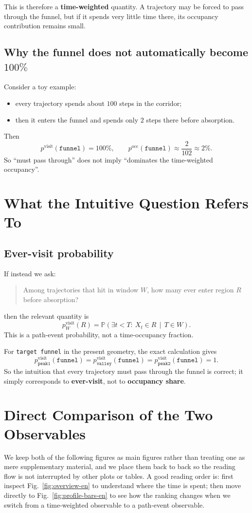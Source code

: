 \documentclass[11pt]{article}
\begin{document}
This is therefore a \textbf{time-weighted} quantity. A trajectory may be forced to pass through the funnel, but if it spends very little time there, its occupancy contribution remains small.

\subsection{Why the funnel does not automatically become $100\%$}
Consider a toy example:
\begin{itemize}
  \item every trajectory spends about $100$ steps in the corridor;
  \item then it enters the funnel and spends only $2$ steps there before absorption.
\end{itemize}
Then
\[
p^{\mathrm{visit}}(\texttt{funnel}) = 100\%,
\qquad
p^{\mathrm{occ}}(\texttt{funnel}) \approx \frac{2}{102}\approx 2\%.
\]
So ``must pass through'' does not imply ``dominates the time-weighted occupancy''.

\section{What the Intuitive Question Refers To}
\subsection{Ever-visit probability}
If instead we ask:
\begin{quote}
Among trajectories that hit in window $W$, how many ever enter region $R$ before absorption?
\end{quote}
then the relevant quantity is
\[
p^{\mathrm{visit}}_W(R)
=
\mathbb{P}\!\left(\exists t<T:\ X_t\in R \,\middle|\, T\in W\right).
\]
This is a path-event probability, not a time-occupancy fraction.

For \texttt{target funnel} in the present geometry, the exact calculation gives
\[
p^{\mathrm{visit}}_{\texttt{peak1}}(\texttt{funnel})
=
p^{\mathrm{visit}}_{\texttt{valley}}(\texttt{funnel})
=
p^{\mathrm{visit}}_{\texttt{peak2}}(\texttt{funnel})
=1.
\]
So the intuition that every trajectory must pass through the funnel is correct; it simply corresponds to \textbf{ever-visit}, not to \textbf{occupancy share}.

\section{Direct Comparison of the Two Observables}
We keep both of the following figures as main figures rather than treating one as mere supplementary material, and we place them back to back so the reading flow is not interrupted by other plots or tables. A good reading order is: first inspect Fig.~\ref{fig:overview-en} to understand where the time is spent; then move directly to Fig.~\ref{fig:profile-bars-en} to see how the ranking changes when we switch from a time-weighted observable to a path-event observable.
\end{document}
